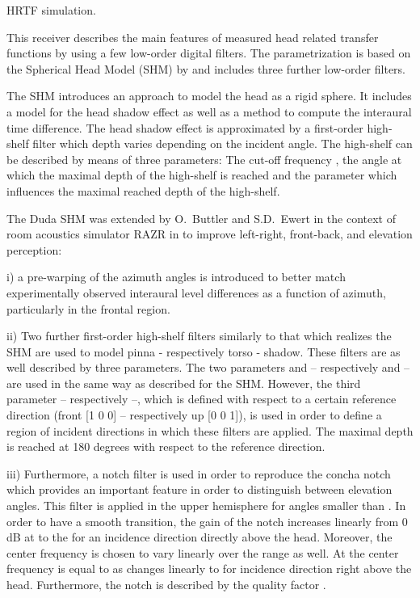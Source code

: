 HRTF simulation.

This receiver describes the main features of measured head related transfer
functions by using a few low-order digital filters. The parametrization is
based on the Spherical Head Model (SHM) by \citet{BrownDuda}
and includes three further low-order filters.

The SHM introduces an approach to model the head as a rigid sphere.
It includes a model for the head shadow effect as well as a method to
compute the interaural time difference.
The head shadow effect is approximated by a first-order high-shelf filter
which depth varies depending on the incident angle. The high-shelf can be
described by means of three parameters: The cut-off frequency ,
the angle  at which the maximal depth of the high-shelf is
reached and the parameter  which influences the maximal
reached depth of the high-shelf.

The Duda SHM was extended by O.\ Buttler and S.D.\ Ewert in the context
of room acoustics simulator RAZR \citep{Wendt2014b,Ewert2018}
in \citet{Buttler2018} to improve left-right, front-back, and
elevation perception:

i) a pre-warping of the azimuth angles is introduced to better match experimentally
observed interaural level differences as a function of azimuth, particularly in
the frontal region.

ii) Two further first-order high-shelf filters similarly to that which
realizes the SHM are used to model pinna
- respectively torso - shadow. These filters are as well described by
three parameters. The two parameters  and
 -- respectively  and
 -- are used in the same way as described for the SHM.
However, the third parameter  -- respectively
 --, which is defined with respect to a certain
reference direction (front [1 0 0] -- respectively up [0 0 1]), is used
in order to define a region of incident directions in which these filters
are applied. The maximal depth is reached at 180 degrees with respect to
the reference direction.

iii) Furthermore, a notch filter is used in order to reproduce the concha notch
which provides an important feature in order to distinguish between elevation
angles. This filter is applied in the upper hemisphere for angles smaller
than . In order to have a smooth transition, the
gain of the notch increases linearly from 0 dB at 
to the  for an incidence direction directly above the head.
Moreover, the center frequency is chosen to vary linearly over the range
as well. At  the center frequency is equal to
 as changes linearly to  for incidence
direction right above the head. Furthermore, the notch is described by the
quality factor .

